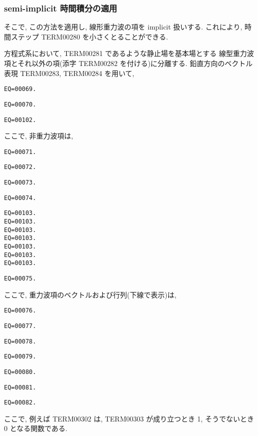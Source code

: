 \subsubsection{semi-implicit 時間積分の適用}

そこで, この方法を適用し, 線形重力波の項を implicit 扱いする.
これにより, 時間ステップ TERM00280 を小さくとることができる.

方程式系において, TERM00281 であるような静止場を基本場とする
線型重力波項とそれ以外の項(添字 TERM00282 を付ける)に分離する.
鉛直方向のベクトル表現
TERM00283, TERM00284 を用いて,
%
\begin{verbatim}
EQ=00069.
\end{verbatim}
%
\begin{verbatim}
EQ=00070.
\end{verbatim}
%
\begin{verbatim}
EQ=00102.
\end{verbatim}

ここで, 非重力波項は,
%
\begin{verbatim}
EQ=00071.
\end{verbatim}
%
\begin{verbatim}
EQ=00072.
\end{verbatim}
%
\begin{verbatim}
EQ=00073.
\end{verbatim}
%
\begin{verbatim}
EQ=00074.
\end{verbatim}
%
\begin{verbatim}
EQ=00103.
EQ=00103.
EQ=00103.
EQ=00103.
EQ=00103.
EQ=00103.
EQ=00103.
\end{verbatim}
\begin{verbatim}
EQ=00075.
\end{verbatim}

ここで, 重力波項のベクトルおよび行列(下線で表示)は,
%
\begin{verbatim}
EQ=00076.
\end{verbatim}
%
\begin{verbatim}
EQ=00077.
\end{verbatim}
%
\begin{verbatim}
EQ=00078.
\end{verbatim}
%
\begin{verbatim}
EQ=00079.
\end{verbatim}
%
\begin{verbatim}
EQ=00080.
\end{verbatim}
%
\begin{verbatim}
EQ=00081.
\end{verbatim}
%
\begin{verbatim}
EQ=00082.
\end{verbatim}
%
ここで, 例えば TERM00302 は,
TERM00303 が成り立つとき 1, そうでないとき 0 となる関数である.

